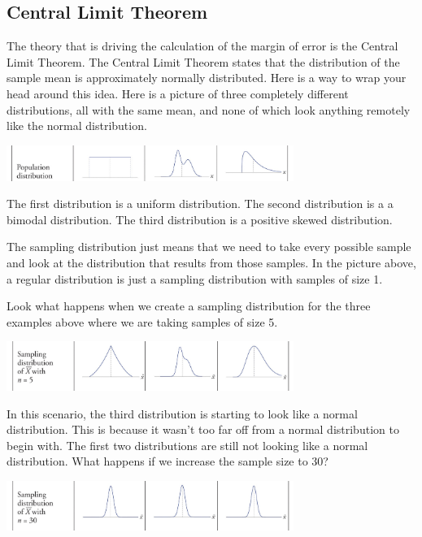 \documentclass[
  letterpaper,
  DIV=11,
  numbers=noendperiod]{scrreprt}
\begin{document}
\subsection*{Central Limit Theorem}\label{central-limit-theorem}

The theory that is driving the calculation of the margin of error is the
Central Limit Theorem. The Central Limit Theorem states that the
distribution of the sample mean is approximately normally distributed.
Here is a way to wrap your head around this idea. Here is a picture of
three completely different distributions, all with the same mean, and
none of which look anything remotely like the normal distribution.

\includegraphics[width=0.7\textwidth,height=\textheight]{./images/EPCI_4.jpg}

The first distribution is a uniform distribution. The second
distribution is a a bimodal distribution. The third distribution is a
positive skewed distribution.

The sampling distribution just means that we need to take every possible
sample and look at the distribution that results from those samples. In
the picture above, a regular distribution is just a sampling
distribution with samples of size 1.

Look what happens when we create a sampling distribution for the three
examples above where we are taking samples of size 5.

\includegraphics[width=0.7\textwidth,height=\textheight]{./images/EPCI_5.jpg}

In this scenario, the third distribution is starting to look like a
normal distribution. This is because it wasn't too far off from a normal
distribution to begin with. The first two distributions are still not
looking like a normal distribution. What happens if we increase the
sample size to 30?

\includegraphics[width=0.7\textwidth,height=\textheight]{./images/EPCI_6.jpg}
\end{document}
